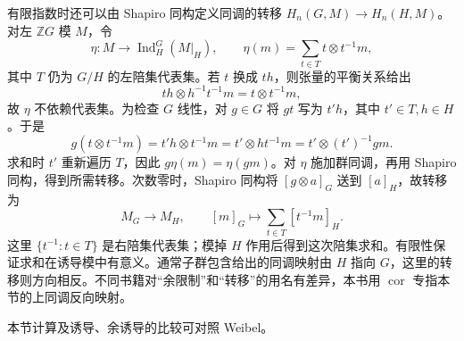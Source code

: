 \ProseParagraphBreak
有限指数时还可以由 Shapiro 同构定义同调的转移 \(H_n(G,M)\to H_n(H,M)\)。对左 \(\mathbb ZG\) 模 \(M\)，令
\[
	\eta:M\longrightarrow\operatorname{Ind}_H^G(M|_H),\qquad \eta(m)=\sum_{t\in T}t\otimes t^{-1}m,
\]
其中 \(T\) 仍为 \(G/H\) 的左陪集代表集。若 \(t\) 换成 \(th\)，则张量的平衡关系给出
\[
	th\otimes h^{-1}t^{-1}m=t\otimes t^{-1}m,
\]
故 \(\eta\) 不依赖代表集。为检查 \(G\) 线性，对 \(g\in G\) 将 \(gt\) 写为 \(t'h\)，其中 \(t'\in T,h\in H\)。于是
\[
	g(t\otimes t^{-1}m) =t'h\otimes t^{-1}m =t'\otimes ht^{-1}m =t'\otimes(t')^{-1}gm.
\]
求和时 \(t'\) 重新遍历 \(T\)，因此 \(g\eta(m)=\eta(gm)\)。对 \(\eta\) 施加群同调，再用 Shapiro 同构，得到所需转移。次数零时，Shapiro 同构将 \([g\otimes a]_G\) 送到 \([a]_H\)，故转移为
\[
	M_G\longrightarrow M_H,\qquad [m]_G\longmapsto\sum_{t\in T}[t^{-1}m]_H.
\]
这里 \(\{t^{-1}:t\in T\}\) 是右陪集代表集；模掉 \(H\) 作用后得到这次陪集求和。有限性保证求和在诱导模中有意义。通常子群包含给出的同调映射由 \(H\) 指向 \(G\)，这里的转移则方向相反。不同书籍对“余限制”和“转移”的用名有差异，本书用 \(\operatorname{cor}\) 专指本节的上同调反向映射。

\ProseParagraphBreak
本节计算及诱导、余诱导的比较可对照 Weibel\cite[Calculation 6.2.1, Theorem 6.2.2, Shapiro's Lemma 6.3.2, Lemma 6.3.4, Application 6.3.9]{Weibel1994HomologicalAlgebra}。
